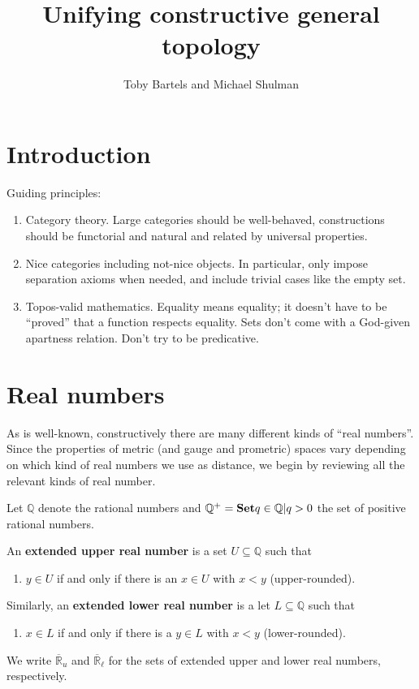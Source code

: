 \documentclass{article}
\title{Unifying constructive general topology}
\author{Toby Bartels and Michael Shulman}
\def\Q{\mathbb{Q}}
\def\Qp{\mathbb{Q}^+}
\def\R{\mathbb{R}}
\def\Re{\overline{\R}}
\def\Reu{\Re_u}
\def\Rel{\Re_{\ell}}
\begin{document}
\maketitle

\section{Introduction}
\label{sec:intro}

Guiding principles:
\begin{enumerate}
\item Category theory.  Large categories should be well-behaved, constructions should be functorial and natural and related by universal properties.
\item Nice categories including not-nice objects.  In particular, only impose separation axioms when needed, and include trivial cases like the empty set.
\item Topos-valid mathematics.  Equality means equality; it doesn't have to be ``proved'' that a function respects equality.  Sets don't come with a God-given apartness relation.  Don't try to be predicative.
\end{enumerate}

\section{Real numbers}
\label{sec:reals}

As is well-known, constructively there are many different kinds of ``real numbers''.
Since the properties of metric (and gauge and prometric) spaces vary depending on which kind of real numbers we use as distance, we begin by reviewing all the relevant kinds of real number.

Let $\Q$ denote the rational numbers and $\Qp = \setof{ q\in \Q | q>0}$ the set of positive rational numbers.

\begin{defn}
  An \textbf{extended upper real number} is a set $U\subseteq \Q$ such that
  \begin{enumerate}
  \item $y\in U$ if and only if there is an $x\in U$ with $x<y$ (upper-rounded).
  \end{enumerate}
  Similarly, an \textbf{extended lower real number} is a let $L\subseteq \Q$ such that
  \begin{enumerate}
  \item $x\in L$ if and only if there is a $y\in L$ with $x<y$ (lower-rounded).
  \end{enumerate}
  We write $\Reu$ and $\Rel$ for the sets of extended upper and lower real numbers, respectively.
\end{defn}
\end{document}

